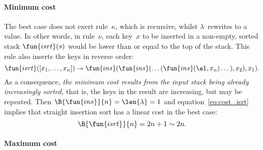 \paragraph{Minimum cost}

The best case does not exert rule~\(\kappa\), which is recursive,
whilst \(\lambda\)~rewrites to a value. In other words, in
rule~\(\nu\), each key~\(x\) to be inserted in a non\hyp{}empty,
sorted stack \(\fun{isrt}(s)\) would be lower
than or equal to the top of the stack. This rule also inserts the keys
in reverse order:
\begin{equation}
\fun{isrt}([x_1,\dots,x_n]) \twoheadrightarrow
\fun{ins}(\fun{ins}(\dots(\fun{ins}(\el,x_n)\dots),x_2),x_1).
\label{inv_isrt}
\end{equation}
As a consequence, \emph{the minimum cost results from the input stack
  being already increasingly sorted,} that is, the keys in the result
are increasing, but may be repeated. Then \(\B{\fun{ins}}{n} =
\len{\lambda} = 1\) and
  equation~\eqref{eq:cost_isrt} implies that straight insertion sort
  has a linear cost in the best case:
\begin{equation*}
\B{\fun{isrt}}{n} = 2n+1 \sim 2n.
\end{equation*}

\paragraph{Maximum cost}


